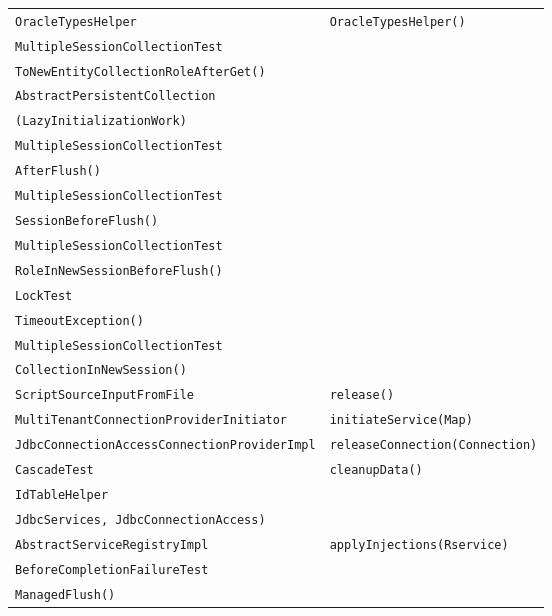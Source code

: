 \begin{center}
\begin{longtable}{ll}
\lstinline/OracleTypesHelper/&{\lstinline/OracleTypesHelper()/}\\
\lstinline/MultipleSessionCollectionTest/&\raisebox{-13pt}{\shortstack{\lstinline/testCopyInitializedCollectionReference/-\\\lstinline/ToNewEntityCollectionRoleAfterGet()/}}\\
\lstinline/AbstractPersistentCollection/&\raisebox{-13pt}{\shortstack{\lstinline/withTemporarySessionIfNeeded/\\\lstinline/(LazyInitializationWork)/}}\\
\lstinline/MultipleSessionCollectionTest/&\raisebox{-13pt}{\shortstack{\lstinline/testCopyPersistentCollectionReference/-\\\lstinline/AfterFlush()/}}\\
\lstinline/MultipleSessionCollectionTest/&\raisebox{-13pt}{\shortstack{\lstinline/testDeleteCopyToNewOwnerInNew/-\\\lstinline/SessionBeforeFlush()/}}\\
\lstinline/MultipleSessionCollectionTest/&\raisebox{-13pt}{\shortstack{\lstinline/testDeleteCopyToNewOwnerNewCollection/-\\\lstinline/RoleInNewSessionBeforeFlush()/}}\\
\lstinline/LockTest/&\raisebox{-13pt}{\shortstack{\lstinline/testFindWithPessimisticWriteLock/-\\\lstinline/TimeoutException()/}}\\
\lstinline/MultipleSessionCollectionTest/&\raisebox{-13pt}{\shortstack{\lstinline/testSaveOrUpdateOwnerWithInitialized/-\\\lstinline/CollectionInNewSession()/}}\\
\lstinline/ScriptSourceInputFromFile/&{\lstinline/release()/}\\
\lstinline/MultiTenantConnectionProviderInitiator/&{\lstinline/initiateService(Map)/}\\
\lstinline/JdbcConnectionAccessConnectionProviderImpl/&{\lstinline/releaseConnection(Connection)/}\\
\lstinline/CascadeTest/&{\lstinline/cleanupData()/}\\
\lstinline/IdTableHelper/&\raisebox{-13pt}{\shortstack{\lstinline/executeIdTableCreationStatements(List,/\\\lstinline/JdbcServices, JdbcConnectionAccess)/}}\\
\lstinline/AbstractServiceRegistryImpl/&{\lstinline/applyInjections(Rservice)/}\\
\lstinline/BeforeCompletionFailureTest/&\raisebox{-13pt}{\shortstack{\lstinline/testUniqueConstraintViolationDuring/-\\\lstinline/ManagedFlush()/}}\\

\end{longtable}
\end{center}
